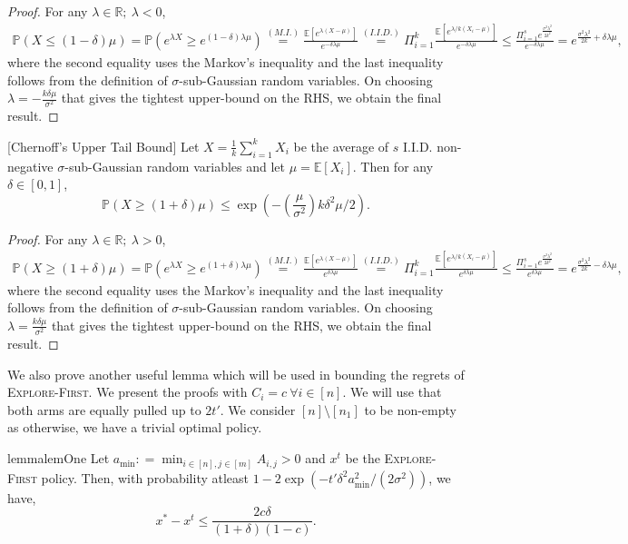 \begin{proof}
For any $\lambda\in \mathbb{R}; ~\lambda<0$,
\begin{align*}
\mathbb{P}(X\leq (1-\delta) \mu) = \mathbb{P}(e^{\lambda X}\geq e^{(1-\delta)\lambda \mu}) \stackrel{(M.I.)}{=} \frac{\mathbb{E}[e^{\lambda (X- \mu)}]}{e^{-\delta\lambda \mu}}\stackrel{(I.I.D.)}{=}\Pi_{i=1}^k \frac{\mathbb{E}[e^{\lambda/k(X_i- \mu)}]}{e^{-\delta\lambda \mu}}\leq  \frac{\Pi_{i=1}^s e^{\frac{\sigma^2 \lambda^2}{2k^2}}}{e^{-\delta\lambda \mu}}=e^{\frac{\sigma^2\lambda^2}{2k}+\delta\lambda \mu},
\end{align*}
where the second equality uses the Markov's inequality and the last inequality follows from the definition of $\sigma$-sub-Gaussian random variables. On choosing $\lambda = -\frac{k\delta  \mu}{\sigma^2}$ that gives the tightest upper-bound on the RHS, we obtain the final result.
\end{proof}

\begin{lemma}\label{lemma:chernoff-utb}
[Chernoff's Upper Tail Bound] Let $X = \frac{1}{k}\sum_{i=1}^k X_i$ be the average of $s$ I.I.D. non-negative $\sigma$-sub-Gaussian random variables and let $ \mu=\mathbb{E}[X_i]$. Then for any $\delta\in [0, 1]$,
$$\mathbb{P}(X\geq (1+\delta) \mu)\leq \exp{\left(-\left(\frac{ \mu}{\sigma^2}\right)k\delta^2 \mu/2\right)}.$$
\end{lemma}

\begin{proof}
For any $\lambda\in \mathbb{R}; ~\lambda>0$,
\begin{align*}
    \mathbb{P}(X\geq (1+\delta) \mu) = \mathbb{P}(e^{\lambda X}\geq e^{(1+\delta)\lambda \mu}) \stackrel{(M.I.)}{=} \frac{\mathbb{E}[e^{\lambda (X- \mu)}]}{e^{\delta\lambda \mu}}\stackrel{(I.I.D.)}{=}\Pi_{i=1}^k \frac{\mathbb{E}[e^{\lambda/k(X_i- \mu)}]}{e^{\delta\lambda \mu}}\leq  \frac{\Pi_{i=1}^s e^{\frac{\sigma^2 \lambda^2}{2k^2}}}{e^{\delta\lambda \mu}}=e^{\frac{\sigma^2\lambda^2}{2k}-\delta\lambda \mu},
\end{align*}
where the second equality uses the Markov's inequality and the last inequality follows from the definition of $\sigma$-sub-Gaussian random variables. On choosing $\lambda = \frac{k\delta  \mu}{\sigma^2}$ that gives the tightest upper-bound on the RHS, we obtain the final result.
\end{proof}
We also prove another useful lemma which will be used in bounding the regrets of \textsc{Explore-First}. We present the proofs with $C_i=c\ \forall i\in [n]$. We will use that both arms are equally pulled up to $2t'$. We consider $[n]\setminus [n_1]$ to be non-empty as otherwise, we have a trivial optimal policy. 
\begin{restatable}{lemma}{lemOne}
\label{lem:lemOne}
Let  $a_{\min} : = \min_{i \in[n],j \in [m]} A_{i,j} > 0$ and $x^t$ be the \textsc{Explore-First} policy.  Then,  with  probability atleast $ 1 - 2 \exp(-t'\delta^2 a_{\min}^2/(2\sigma^2))$,  we have, 
$$ x^* - x^t \leq \frac{2c\delta}{(1+\delta)(1-c)}.$$  
\end{restatable}


